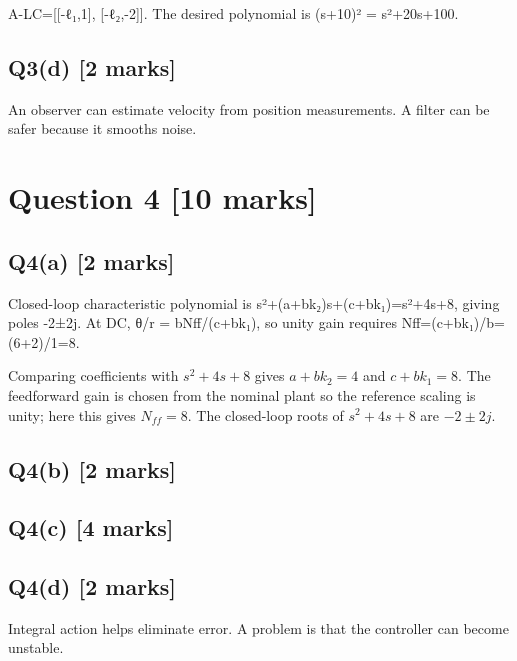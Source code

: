 \documentclass[11pt,a4paper]{article}
\begin{document}
A-LC=[[-ℓ₁,1], [-ℓ₂,-2]].
The desired polynomial is (s+10)² = s²+20s+100.

\subsection*{Q3(d) \hfill [2 marks]}

An observer can estimate velocity from position measurements.
A filter can be safer because it smooths noise.

\section*{Question 4 \hfill [10 marks]}
\subsection*{Q4(a) \hfill [2 marks]}

Closed-loop characteristic polynomial is s²+(a+bk₂)s+(c+bk₁)=s²+4s+8, giving poles -2±2j.
At DC, θ/r = bNff/(c+bk₁), so unity gain requires Nff=(c+bk₁)/b=(6+2)/1=8.\par\smallskip Comparing coefficients with $s^2+4s+8$ gives $a+bk_2=4$ and $c+bk_1=8$. The feedforward gain is chosen from the nominal plant so the reference scaling is unity; here this gives $N_{ff}=8$. The closed-loop roots of $s^2+4s+8$ are $-2\pm2j$.

\subsection*{Q4(b) \hfill [2 marks]}

\vspace{2mm}

\subsection*{Q4(c) \hfill [4 marks]}

\vspace{2mm}

\subsection*{Q4(d) \hfill [2 marks]}

Integral action helps eliminate error.
A problem is that the controller can become unstable.
\end{document}
